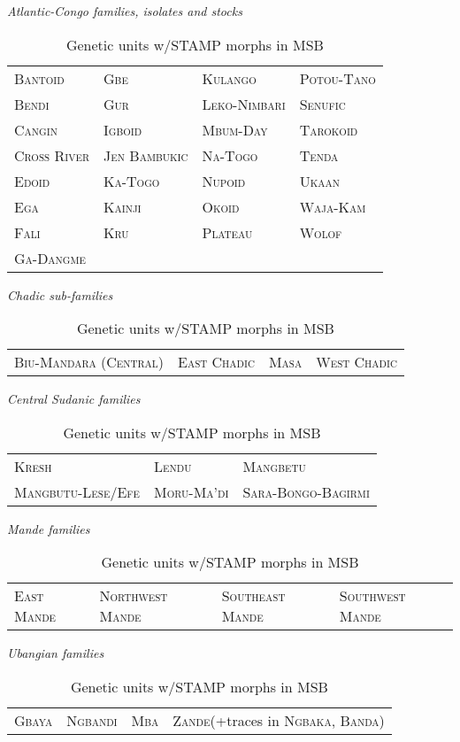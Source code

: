 \documentclass[output=paper]{langsci/langscibook}
\begin{document}
\begin{table} 
\caption{Genetic units w/STAMP morphs in MSB \citep{Anderson2011, Dimmendaal2008, Dimmendaal2011, Sands2009}}
\label{tab:Anderson:2}
\centering
\textit{Atlantic-Congo families, isolates and stocks}\\
\begin{tabular}{llll}
\hline
\textsc{Bantoid} & \textsc{Gbe} & \textsc{Kulango} & \textsc{Potou-Tano}\\
\textsc{Bendi} & \textsc{Gur} & \textsc{Leko-Nimbari} & \textsc{Senufic}\\
\textsc{Cangin} & \textsc{Igboid} & \textsc{Mbum-Day} & \textsc{Tarokoid}\\
\textsc{Cross River} & \textsc{Jen Bambukic} & \textsc{Na-Togo} & \textsc{Tenda}\\
\textsc{Edoid} & \textsc{Ka-Togo} & \textsc{Nupoid} & \textsc{Ukaan}\\
\textsc{Ega} & \textsc{Kainji} & \textsc{Okoid} & \textsc{Waja-Kam}\\
\textsc{Fali} & \textsc{Kru} & \textsc{Plateau} & \textsc{Wolof} \\
\textsc{Ga-Dangme} &  & & \\
\end{tabular}

\textit{Chadic sub-families}\\
\begin{tabular}{llll}
\textsc{Biu-Mandara (Central)} & \textsc{East Chadic} & \textsc{Masa} & \textsc{West Chadic}\\
\end{tabular}

\bigskip

\textit{Central Sudanic families}\\
\begin{tabular}{lll}
\textsc{Kresh} & \textsc{Lendu} & \textsc{Mangbetu}\\
\textsc{Mangbutu-Lese/Efe} & \textsc{Moru-Ma'di} & \textsc{Sara-Bongo-Bagirmi}\\
\end{tabular}

\bigskip


\textit{Mande families}\\
\begin{tabular}{llll}
\textsc{East Mande} &  \textsc{Northwest Mande} & \textsc{Southeast Mande} & \textsc{Southwest Mande}
\end{tabular}

\bigskip


\textit{Ubangian families}\\
\begin{tabular}{llll}
\textsc{Gbaya} & \textsc{Ngbandi} & \textsc{Mba} & \textsc{Zande}(+traces in \textsc{Ngbaka, Banda)}\\
\end{tabular}
\end{table}
\end{document}
